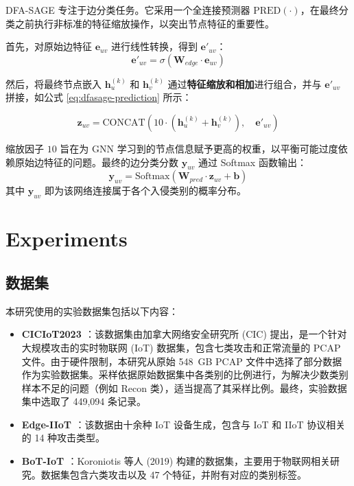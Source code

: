 \documentclass{article}
\begin{document}
DFA-SAGE 专注于边分类任务。它采用一个全连接预测器
$\text{PRED}(\cdot)$，在最终分类之前执行非标准的特征缩放操作，以突出节点特征的重要性。

首先，对原始边特征 $\mathbf{e}_{uv}$ 进行线性转换，得到 $\mathbf{e}'_{uv}$：
\begin{equation}
  \mathbf{e}'_{uv} = \sigma(\mathbf{W}_{edge} \cdot \mathbf{e}_{uv})
\end{equation}

然后，将最终节点嵌入 $\mathbf{h}_u^{(k)}$ 和 $\mathbf{h}_v^{(k)}$
通过\textbf{特征缩放和相加}进行组合，并与 $\mathbf{e}'_{uv}$ 拼接，如公式
\eqref{eq:dfasage-prediction} 所示：

\begin{equation}
  \mathbf{z}_{uv} = \text{CONCAT} \left( 10 \cdot (\mathbf{h}_u^{(k)}
  + \mathbf{h}_v^{(k)}), \quad \mathbf{e}'_{uv} \right)
  \label{eq:dfasage-prediction}
\end{equation}

缩放因子 $10$ 旨在为 GNN 学习到的节点信息赋予更高的权重，以平衡可能过度依赖原始边特征的问题。最终的边分类分数
$\mathbf{y}_{uv}$ 通过 Softmax 函数输出：
$$
\mathbf{y}_{uv} = \text{Softmax} \left( \mathbf{W}_{pred} \cdot
\mathbf{z}_{uv} + \mathbf{b} \right)
$$
其中 $\mathbf{y}_{uv}$ 即为该网络连接属于各个入侵类别的概率分布。

\section{Experiments}

\subsection{数据集}

本研究使用的实验数据集包括以下内容：

\begin{itemize}
  \item \textbf{CICIoT2023 \cite{202305.0443}}：该数据集由加拿大网络安全研究所 (CIC)
    提出，是一个针对大规模攻击的实时物联网 (IoT) 数据集，包含七类攻击和正常流量的 PCAP 文件。由于硬件限制，本研究从原始
    548~GB PCAP
    文件中选择了部分数据作为实验数据集。采样依据原始数据集中各类别的比例进行，为解决少数类别样本不足的问题（例如 Recon
    类），适当提高了其采样比例。最终，实验数据集中选取了 449,094 条记录。

  \item \textbf{Edge-IIoT \cite{9751703}}：该数据由十余种 IoT 设备生成，包含与 IoT 和
    IIoT 协议相关的 14 种攻击类型。

  \item \textbf{BoT-IoT \cite{KORONIOTIS2019779}}：Koroniotis 等人
    (2019) 构建的数据集，主要用于物联网相关研究。数据集包含六类攻击以及 47 个特征，并附有对应的类别标签。
\end{itemize}
\end{document}
